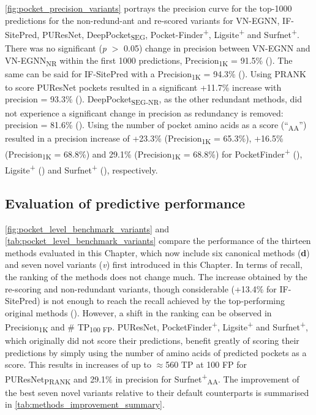 \autoref{fig:pocket_precision_variants} portrays the precision curve for the top-1000 predictions for the non-redund-ant and re-scored variants for VN-EGNN, IF-SitePred, PUResNet, DeepPocket\textsubscript{SEG}, Pocket-Finder\textsuperscript{+}, Ligsite\textsuperscript{+} and Surfnet\textsuperscript{+}. There was no significant (\textit{p} $>$ 0.05) change in precision between VN-EGNN and VN-EGNN\textsubscript{NR} within the first 1000 predictions, Precision\textsubscript{1K} = 91.5\% (). The same can be said for IF-SitePred with a Precision\textsubscript{1K} = 94.3\% (). Using PRANK to score PUResNet pockets resulted in a significant +11.7\% increase with precision = 93.3\% (). DeepPocket\textsubscript{SEG-NR}, as the other redundant methods, did not experience a significant change in precision as redundancy is removed: precision = 81.6\% (). Using the number of pocket amino acids as a score (``\textsubscript{AA}'') resulted in a precision increase of +23.3\% (Precision\textsubscript{1K} = 65.3\%), +16.5\% (Precision\textsubscript{1K} = 68.8\%) and 29.1\% (Precision\textsubscript{1K} = 68.8\%) for PocketFinder\textsuperscript{+} (), Ligsite\textsuperscript{+} () and Surfnet\textsuperscript{+} (), respectively.

\subsection{Evaluation of predictive performance}

\autoref{fig:pocket_level_benchmark_variants} and \autoref{tab:pocket_level_benchmark_variants} compare the performance of the thirteen methods evaluated in this Chapter, which now include six canonical methods (\textbf{d}) and seven novel variants (\textit{v}) first introduced in this Chapter. In terms of recall, the ranking of the methods does not change much. The increase obtained by the re-scoring and non-redundant variants, though considerable (+13.4\% for IF-SitePred) is not enough to reach the recall achieved by the top-performing original methods (). However, a shift in the ranking can be observed in Precision\textsubscript{1K} and \# TP\textsubscript{100 FP}. PUResNet, PocketFinder\textsuperscript{+}, Ligsite\textsuperscript{+} and Surfnet\textsuperscript{+}, which originally did not score their predictions, benefit greatly of scoring their predictions by simply using the number of amino acids of predicted pockets as a score. This results in increases of up to $\approx$560 TP at 100 FP for PUResNet\textsubscript{PRANK} and 29.1\% in precision for Surfnet\textsuperscript{+}\textsubscript{AA}. The improvement of the best seven novel variants relative to their default counterparts is summarised in \autoref{tab:methods_improvement_summary}.

